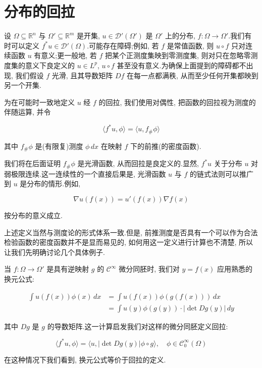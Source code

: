 \section{分布的回拉}

设 $\Omega\subseteq\mathbb{R}^n$ 与 $\Omega'\subseteq\mathbb{R}^m$ 是开集, $u\in\mathcal{D}'(\Omega')$ 是 $\Omega'$ 上的分布, $f : \Omega\to\Omega'$.我们有时可以定义 $f^*u\in\mathcal{D}'(\Omega)$.可能存在障碍;例如, 若 $f$ 是常值函数, 则 $u\circ f$ 只对连续函数 $u$ 有意义;更一般地, 若 $f$ 把某个正测度集映到零测度集, 则对只在忽略零测度集的意义下良定义的 $u\in L^p$, $u\circ f$ 甚至没有意义.为确保上面提到的障碍都不出现, 我们假设 $f$ 光滑, 且其导数矩阵 $Df$ 在每一点都满秩, 从而至少任何开集都映到另一个开集.

为在可能时一致地定义 $u$ 经 $f$ 的回拉, 我们使用对偶性, 把函数的回拉视为测度的伴随运算, 并令

\[
\langle f^*u, \phi\rangle = \langle u, f_{\#}\phi\rangle
\]

其中 $f_{\#}\phi$ 是(有限复)测度 $\phi\, dx$ 在映射 $f$ 下的前推(的密度函数).

我们将在后面证明 $f_{\#}\phi$ 是光滑函数, 从而回拉是良定义的.显然, $f^*u$ 关于分布 $u$ 对弱极限连续.这一连续性的一个直接后果是, 光滑函数 $u$ 与 $f$ 的链式法则可以推广到 $u$ 是分布的情形.例如,

\[
\nabla u(f(x)) = u'(f(x))\nabla f(x)
\]

按分布的意义成立.

上述定义当然与测度论的形式体系一致.但是, 前推测度是否具有一个可以作为合法检验函数的密度函数并不是显而易见的, 如何用这一定义进行计算也不清楚, 所以让我们先明确讨论几个具体例子.

\begin{example*}
当 $f : \Omega\to\Omega'$ 是具有逆映射 $g$ 的 $\mathcal{C}^{\infty}$ 微分同胚时, 我们对 $y = f(x)$ 应用熟悉的换元公式:

\[
\begin{aligned}
\int u(f(x))\phi(x)\, dx &= \int u(f(x))\phi(g(f(x)))\, dx \\
&= \int u(y)\phi(g(y))\cdot|\det Dg(y)|\, dy
\end{aligned}
\]

其中 $Dg$ 是 $g$ 的导数矩阵.这一计算启发我们对这样的微分同胚定义回拉:

\[
\langle f^*u, \phi\rangle = \langle u, |\det Dg(y)|\phi\circ g\rangle, \quad \phi\in\mathcal{C}_0^{\infty}(\Omega)
\]

在这种情况下我们看到, 换元公式等价于回拉的定义.
\end{example*}

